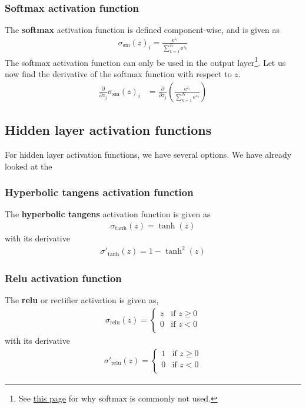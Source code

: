 \documentclass[a4paper,10pt]{article}
\newcommand{\e}[1]{\mathrm{e}^{#1}}
\begin{document}
\subsubsection{Softmax activation function}
The \textbf{softmax} activation function is defined component-wise, and is given as
\begin{align}
    \sigma_\mathrm{sm}(z)_i = \frac{\e{z_i}}{\sum^{K}_{k=1}\e{z_k}}
    \label{eq:softmax-activation}
\end{align}
The softmax activation function can only be used in the output layer\footnote{See \href{https://stackoverflow.com/questions/37588632/why-use-softmax-only-in-the-output-layer-and-not-in-hidden-layers}{this page} for why softmax is commonly not used.}. Let us now find the derivative of the softmax function with respect to $z$.
\begin{align*}
    \frac{\partial}{\partial z_j} \sigma_\mathrm{sm}(z)_i &= \frac{\partial}{\partial z_j}\left( \frac{\e{z_i}}{\sum^K_{k=1} \e{z_k}} \right)
\end{align*}

\subsection{Hidden layer activation functions}
For hidden layer activation functions, we have several options. We have already looked at the 

\subsubsection{Hyperbolic tangens activation function}
The \textbf{hyperbolic tangens} activation function is given as
\begin{align}
    \sigma_\mathrm{tanh}(z) = \tanh(z)
    \label{eq:act-tanh}
\end{align}
with its derivative
\begin{align}
    \sigma'_\mathrm{tanh}(z) = 1 - \tanh^2(z)
    \label{eq:act-tanh-der}
\end{align}

\subsubsection{Relu activation function}
The \textbf{relu} or rectifier activation is given as,
\begin{align}
    \sigma_\mathrm{relu}(z) = 
    \begin{cases}
        z & \text{if } z \geq 0 \\
        0 & \text{if } z < 0 \\
    \end{cases}
    \label{eq:act-relu}
\end{align}
with its derivative
\begin{align}
    \sigma'_\mathrm{relu}(z) = 
    \begin{cases}
        1 & \text{if } z \geq 0 \\
        0 & \text{if } z < 0 \\
    \end{cases}
    \label{eq:act-relu-der}
\end{align}
\end{document}
